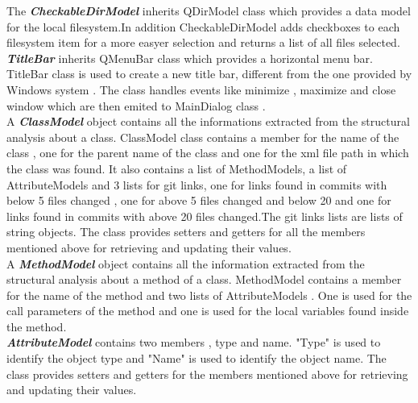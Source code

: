 The \textit{\textbf{ CheckableDirModel}} inherits QDirModel class which provides a data model for the local filesystem.In addition CheckableDirModel adds checkboxes to each filesystem item for a more easyer selection and returns a list of all files selected. \\

\textit{\textbf{ TitleBar}} inherits QMenuBar class which provides a horizontal menu bar. TitleBar class is used to create a new title bar, different from the one provided by Windows system . The class handles events like minimize , maximize and close window which are then emited to MainDialog class .\\

 A \textit{\textbf{ClassModel}} object contains all the informations extracted from the structural analysis about a class. ClassModel class contains a member for the name of the class , one for the parent name of the class and one for the xml file path in which the class was found. It also contains a list of MethodModels, a list of AttributeModels and 3 lists for git links, one for links found in commits with below 5 files changed , one for above 5 files changed and below 20 and one for links found in commits with above 20 files changed.The git links lists are lists of string objects. The class provides setters and getters for all the members mentioned above for retrieving and updating their values. \\

A \textit{\textbf{MethodModel}} object contains all the information extracted from the structural analysis about a method of a class. MethodModel contains a member for the name of the method and two lists of AttributeModels . One is used for the call parameters of the method and one is used for the local variables found inside the method.\\

 \textit{\textbf{AttributeModel}} contains two members , type and name. "Type" is used to identify the object type and "Name" is used to identify the object name. The class provides setters and getters for the members mentioned above for retrieving and updating their values. \\

